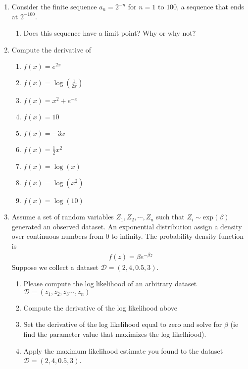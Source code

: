 \begin{enumerate}
    \item Consider the finite sequence $a_{n} = 2^{-n}$ for $n=1$ to $100$, a sequence that ends at $2^{-100}$. 
    \begin{enumerate}
        \item Does this sequence have a limit point? Why or why not?
    \end{enumerate}
    
    \item Compute the derivative of 
    \begin{enumerate}
        \item $f(x) = e^{2x}$
        \item $f(x) = \log(\frac{1}{2x})$
        \item $f(x) = x^{2} + e^{-x}$
        \item $f(x) = 10$
        \item $f(x) = -3x$
        \item $f(x) = \frac{1}{2}x^{2}$
        \item $f(x) = \log(x)$
        \item $f(x) = \log(x^{2})$
        \item $f(x) = \log(10)$
    \end{enumerate}
    
    \item  Assume a set of random variables $Z_{1}, Z_{2}, \cdots, Z_{n}$ such that $Z_{i} \sim \text{exp}(\beta)$ generated an observed dataset. An exponential distribution assign a density over continuous numbers from 0 to infinity. The probability density function is 
    \begin{align*}
        f(z) = \beta e^{-\beta z}     
    \end{align*}
    Suppose we collect a dataset $\mathcal{D} = (2,4,0.5,3)$.
    \begin{enumerate}
        \item Please compute the log likelihood of an arbitrary dataset $\mathcal{D} = (z_{1},z_{2},z_{3}\cdots,z_{n})$
        \item Compute the derivative of the log likelihood above
        \item Set the derivative of the log likelihood equal to zero and solve for $\beta$ (ie find the parameter value that maximizes the log likelhiood). 
        \item Apply the maximum likelihood estimate you found to the dataset  $\mathcal{D} = (2,4,0.5,3)$.
    \end{enumerate}
    

\end{enumerate}

